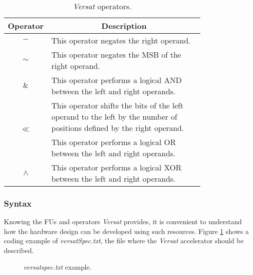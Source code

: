 \begin{table}[H]
    \centering
    \begin{tabular}{|c|p{0.8\linewidth}|}
        \hline
        \multicolumn{1}{|c|}{\textbf{Operator}} & \multicolumn{1}{c|}{\textbf{Description}} \\
        \hline
        \multirow{1}{*}{\textbf{$-$}} & This operator negates the right operand.  \\
        \hline
        \multirow{1}{*}{\textbf{$\sim$}} & This operator negates the MSB of the right operand. \\
        \hline
        \multirow{1}{*}{\textbf{$\And$}} & This operator performs a logical AND between the left and right operands. \\
        \hline
        \multirow{2}{*}{\textbf{$\ll$}} & This operator shifts the bits of the left operand to the left by the number of positions defined by the right operand. \\
        \hline
        \multirow{1}{*}{\textbf{$\vert$}} & This operator performs a logical OR between the left and right operands. \\
        \hline
        \multirow{1}{*}{\textbf{$\wedge$}} & This operator performs a logical XOR between the left and right operands. \\
        \hline
    \end{tabular}
    \caption{\textit{Versat} operators.}
    \label{tab:op}
\end{table}

\vspace{0.5cm}

\subsubsection{Syntax}

Knowing the FUs and operators \textit{Versat} provides, it is convenient to understand how the hardware design can be developed using such resources.
Figure \ref{versatspec} shows a coding example of \textit{versatSpec.txt}, the file where the \textit{Versat} accelerator should be described.

\vspace{1cm}

\begin{figure}[H]
\centerline{}
\caption{\textit{versatspec.txt} example.}
\label{versatspec}
\end{figure}

